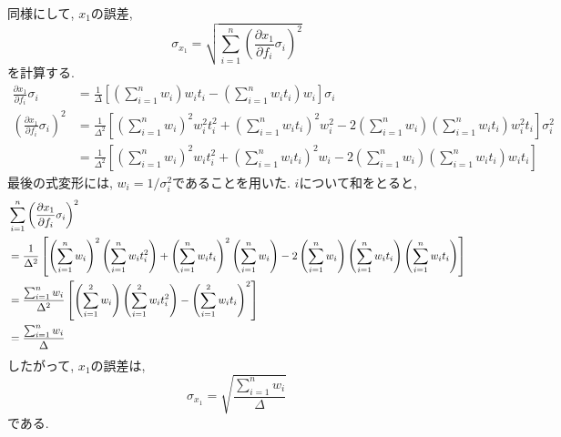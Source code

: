 同様にして, $x_{1}$の誤差, 
\begin{equation}
    \sigma_{x_{1}}
    =
    \sqrt
    {
        \sum_{i=1}^{n}
        \left(\frac{\partial x_{1}}{\partial f_{i}} \sigma_{i}\right)^{2}
    }
\end{equation}
を計算する. 
\begin{align}
    \frac{\partial x_{1}}{\partial f_{i}} \sigma_{i}
    &=
    \frac{1}{\Delta}
    \left[
        \left(\sum_{i=1}^{n} w_{i}\right) w_{i} t_{i}
        -
        \left(\sum_{i=1}^{n} w_{i} t_{i}\right)w_{i}
    \right] \sigma_{i}
    \\
    \left(\frac{\partial x_{1}}{\partial f_{i}} \sigma_{i}\right)^{2}
    &=
    \frac{1}{\Delta^{2}}
    \left[
        \left(\sum_{i=1}^{n} w_{i}\right)^{2} w_{i}^{2} t_{i}^{2}
        +
        \left(\sum_{i=1}^{n} w_{i} t_{i}\right)^{2} w_{i}^{2}
        -
        2
        \left(\sum_{i=1}^{n} w_{i}\right)
        \left(\sum_{i=1}^{n} w_{i} t_{i}\right) w_{i}^{2} t_{i}
    \right] \sigma_{i}^{2}
    \\ &=
    \frac{1}{\Delta^{2}}
    \left[
        \left(\sum_{i=1}^{n} w_{i}\right)^{2} w_{i} t_{i}^{2}
        +
        \left(\sum_{i=1}^{n} w_{i} t_{i}\right)^{2} w_{i}
        -
        2
        \left(\sum_{i=1}^{n} w_{i}\right)
        \left(\sum_{i=1}^{n} w_{i} t_{i}\right) w_{i} t_{i}
    \right]
\end{align}
最後の式変形には, $w_{i} = 1/\sigma_{i}^{2}$であることを用いた. 
$i$について和をとると, 
\begin{align}
    &
    \sum_{i=1}^{n}
    \left(\frac{\partial x_{1}}{\partial f_{i}} \sigma_{i}\right)^{2}
    \notag \\
    &=
    \frac{1}{\Delta^{2}}
    \left[
        \left(\sum_{i=1}^{n} w_{i}\right)^{2}
        \left(\sum_{i=1}^{n} w_{i} t_{i}^{2}\right)
        +
        \left(\sum_{i=1}^{n} w_{i} t_{i}\right)^{2}
        \left(\sum_{i=1}^{n} w_{i}\right)
        -
        2
        \left(\sum_{i=1}^{n} w_{i}\right)
        \left(\sum_{i=1}^{n} w_{i} t_{i}\right)
        \left(\sum_{i=1}^{n} w_{i} t_{i}\right)
    \right]
    \notag
    \\ &=
    \frac{\sum_{i=1}^{n} w_{i}}{\Delta^{2}}
    \left[
        \left(\sum_{i=1}^{2} w_{i}\right)
        \left(\sum_{i=1}^{2} w_{i} t_{i}^{2}\right)
        -
        \left(\sum_{i=1}^{2} w_{i} t_{i}\right)^{2}
    \right]
    \notag
    \\ &=
    \frac{\sum_{i=1}^{n} w_{i}}{\Delta}
\end{align}
したがって, $x_{1}$の誤差は, 
\begin{equation}
    \sigma_{x_{1}}
    =
    \sqrt{\frac{\sum_{i=1}^{n} w_{i}}{\Delta}}
\end{equation}
である. 

\clearpage
%
%

